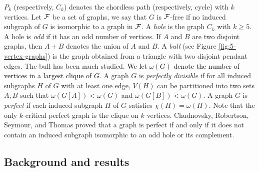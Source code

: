 \documentclass[a4paper,11pt]{article}
\theoremstyle{case}
\newcommand{\thecolor}{black}
\begin{document}
$P_k$ (respectively, $C_k$) denotes the chordless path (respectively, cycle) with $k$ vertices. Let ${\cal F}$ be a set of graphs, we say that $G$ is ${\cal F}$-free if no induced subgraph of $G$ is isomorphic to a graph in ${\cal F}$. A {\it hole} is the graph $C_k$ with $k \geq 5$. A hole is {\it odd} if it has an odd number of vertices. 
If $A$ and $B$ are two disjoint graphs, then $A + B$ denotes the union of $A$ and $B$. A {\it bull} (see Figure \ref{fig:5-vertex-graphs}) is the graph obtained from a triangle with two disjoint pendant edges.  The bull has been much studied. 
%
\textcolor{\thecolor}{
We let $\omega(G)$ denote the number of vertices in a largest clique of $G$. 
}
%
A graph $G$ is  {\it perfectly divisible }if for all induced subgraphs $H$ of $G$ with at least one edge, $V(H)$ can be partitioned into two sets $A,B$ such that $\omega(G[A]) < \omega(G)$ and $\omega(G[B]) < \omega(G)$. A graph $G$ is {\it perfect} if each induced subgraph $H$ of $G$ satisfies $\chi(H) = \omega(H)$. Note that the only $k$-critical perfect graph is the clique on $k$ vertices. Chudnovsky, Robertson, Seymour, and Thomas \cite{ChuRob2006} proved that a graph is perfect if and only if it does not contain an induced subgraph isomorphic to an odd hole or its complement. 

\subsection{Background and results}
\end{document}
